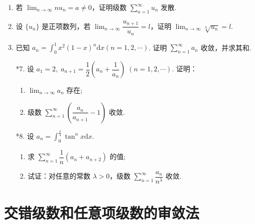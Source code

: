 \begin{enumerate}
    \item 若 $\displaystyle\lim_{n\to\infty}nu_n=a\not=0$，证明级数 $\displaystyle\sum_{n=1}^{\infty}u_n$ 发散.
    
    \item 设 $\{u_n\}$ 是正项数列，若 $\displaystyle\lim_{n\to\infty}\dfrac{u_{n+1}}{u_n}=l$，证明 $\displaystyle\lim_{n\to\infty}\sqrt[n]{u_n}=l$.
    
    \item 已知 $\displaystyle a_n=\int_0^1x^2(1-x)^n\text{d}x(n=1,2,\cdots)$. 证明 $\displaystyle\sum_{n=1}^{\infty}a_n$ 收敛，并求其和.
    
    \item[*7.] 设 $a_1=2,\;a_{n+1}=\dfrac{1}{2}\left(a_n+\dfrac{1}{a_n}\right)\;(n=1,2,\cdots)$. 证明：
    \begin{enumerate}[(1)]
        \item $\displaystyle\lim_{n\to\infty}a_n$ 存在;
        \item 级数 $\displaystyle\sum_{n=1}^{\infty}\left(\dfrac{a_n}{a_{n+1}}-1\right)$ 收敛.
    \end{enumerate}  

    \item[*8.] 设 $\displaystyle a_{n}=\int_0^{\frac{\pi}{4}}\tan^nx\text{d}x$.
    \begin{enumerate}[(1)]
        \item 求 $\displaystyle\sum_{n=1}^{\infty}\dfrac{1}{n}(a_{n}+a_{n+2})$ 的值;
        \item 试证：对任意的常数 $\lambda>0$，级数 $\displaystyle\sum_{n=1}^{\infty}\dfrac{a_n}{n^{\lambda}}$ 收敛.
    \end{enumerate} 
\end{enumerate}

\section{交错级数和任意项级数的审敛法}

